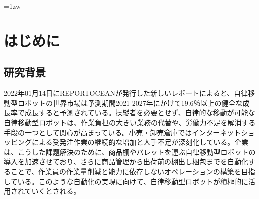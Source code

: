 \documentclass[a4paper]{jreport}	%
\begin{document}
\makecover

\addtolength{\textheight}{-5mm}	%
\setlength{\footskip}{15mm}	%
\fontsize{11pt}{15pt}\selectfont

\pagebreak\setcounter{page}{1}
\pagestyle{plain}
\tableofcontents
\listoffigures

\parindent=1zw	%
\pagebreak\setcounter{page}{1}
\pagestyle{plain}



\chapter{はじめに}
\section{研究背景}


2022年01月14日にREPORTOCEANが発行した新しいレポートによると、自律移動型ロボットの世界市場は予測期間2021-2027年にかけて19.6％以上の健全な成長率で成長すると予測されている\cite{report1}。操縦者を必要とせず、自律的な移動が可能な自律移動型ロボットは、作業負担の大きい業務の代替や、労働力不足を解消する手段の一つとして関心が高まっている。小売・卸売倉庫ではインターネットショッピングによる受発注作業の継続的な増加と人手不足が深刻化している。企業は、こうした課題解決のために、商品棚やパレットを運ぶ自律移動型ロボットの導入を加速させており、さらに商品管理から出荷前の棚出し梱包までを自動化することで、作業員の作業量削減と能力に依存しないオペレーションの構築を目指している。このような自動化の実現に向けて、自律移動型ロボットが積極的に活用されていくとされる\cite{report2}。
\end{document}

